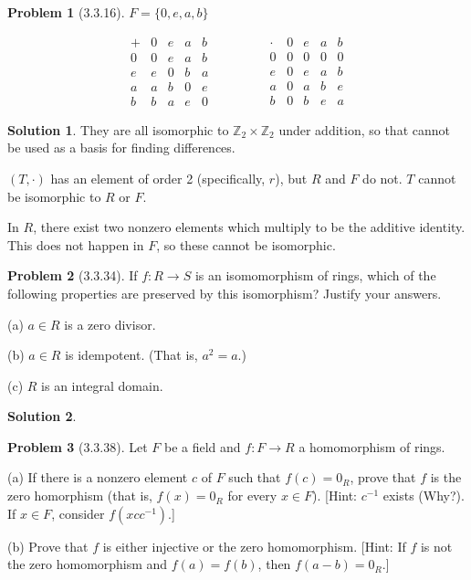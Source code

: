 \documentclass[12pt]{article}
\theoremstyle{definition}
\newtheorem*{prob}{Problem}
\newtheorem*{soln}{Solution}
\newcommand{\ZZ}{{\mathbb{Z}}}
\begin{document}
\begin{prob}[3.3.16]
$F = \{ 0, e, a, b \}$

\[
\begin{array}{c|cccc}
+ & 0 & e & a & b \\
\hline
0      & 0 & e & a & b  \\
e      & e & 0 & b & a  \\
a      & a & b & 0 & e  \\
b      & b & a & e & 0 
\end{array}
\qquad\qquad
\begin{array}{c|cccc}
\cdot & 0 & e & a & b \\
\hline
0      & 0 & 0 & 0 & 0  \\
e      & 0 & e & a & b  \\
a      & 0 & a & b & e  \\
b      & 0 & b & e & a 
\end{array}
\]
\end{prob}

\begin{soln}

They are all isomorphic to $\ZZ_2\times\ZZ_2$ under addition,
so that cannot be used as a basis for finding differences.

$(T,\cdot)$ has an element of order 2 (specifically, $r$),
but $R$ and $F$ do not.
$T$ cannot be isomorphic to $R$ or $F$.

In $R$, there exist two nonzero elements
which multiply to be the additive identity.
This does not happen in $F$,
so these cannot be isomorphic.

\end{soln}

\begin{prob}[3.3.34]
If  $f:R \to S$ is an isomomorphism of  rings, which of  the following properties are 
preserved by this isomorphism? Justify your answers.     

(a) $a\in R$ is a zero divisor.

(b) $a\in R$ is idempotent. (That is, $a^2=a$.)

(c) $R$ is an integral domain.
\end{prob}

\begin{soln}

\end{soln}

\begin{prob}[3.3.38]
Let $F$ be a field and $f:F \to R$ a homomorphism of  rings.     

(a)   If there is a nonzero element $c$ of  $F$ such that $f(c) = 0_R$, 
prove that $f$ is the zero homorphism (that is, $f(x) = 0_R$ for every $x\in F$). 
[Hint: $c^{-1}$ exists (Why?). If  $x\in F$, consider $f(xcc^{-1})$.]     

(b)   Prove that $f$ is either injective or the zero homomorphism. 
[Hint: If  $f$ is not the zero homomorphism and $f(a) = f(b)$, then $f(a - b) = 0_R$.]
\end{prob}
\end{document}
